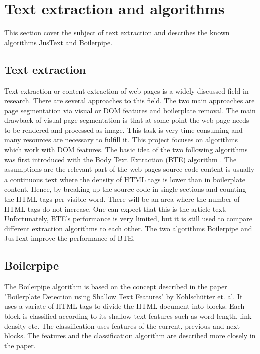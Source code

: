  \section{Text extraction and algorithms}

 This section cover the subject of text extraction and describes the known algorithms JusText and Boilerpipe.

 \subsection{Text extraction}

 Text extraction or content extraction of web pages is a widely discussed field in research. There are several approaches to this field. The two main approaches are page segmentation via visual or DOM features and boilerplate removal. The main drawback of visual page segmentation is that at some point the web page needs to be rendered and processed as image. This task is very time-consuming and many resources are necessary to fulfill it. This project focuses on algorithms which work with DOM features.
 The basic idea of the two following algorithms was first introduced with the Body Text Extraction (BTE) algorithm \cite{Finn01factor}. The assumptions are the relevant part of the web pages source code content is usually a continuous text where the density of HTML tags is lower than in boilerplate content. Hence, by breaking up the source code in single sections and counting the HTML tags per visible word. There will be an area where the number of HTML tags do not increase. One can expect that this is the article text. Unfortunately, BTE's performance is very limited, but it is still used to compare different extraction algorithms to each other. The two algorithms Boilerpipe and JusText improve the performance of BTE.

 \subsection{Boilerpipe}

 The Boilerpipe  algorithm \cite{algo:boilerpipe} is based on the concept described in the paper "Boilerplate Detection using Shallow Text Features" \cite{paper:boilerpipe} by Kohlschütter et. al. It uses a variate of HTML tags  to divide the HTML document into blocks. Each block is classified according to its shallow text features such as word length, link density etc. The classification uses features of the current, previous and next blocks. The features and the classification algorithm are described more closely in the paper.

